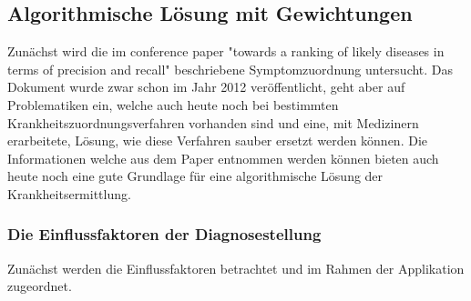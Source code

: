 \subsection{Algorithmische Lösung mit Gewichtungen}
Zunächst wird die im conference paper "towards a ranking of likely diseases in terms of precision and recall" beschriebene Symptomzuordnung untersucht. Das Dokument wurde zwar schon im Jahr 2012 veröffentlicht, geht aber auf Problematiken ein, welche auch heute noch bei bestimmten Krankheitszuordnungsverfahren vorhanden sind und eine, mit Medizinern erarbeitete, Lösung, wie diese Verfahren sauber ersetzt werden können. Die Informationen welche aus dem Paper entnommen werden können bieten auch heute noch eine gute Grundlage für eine algorithmische Lösung der Krankheitsermittlung.

\subsubsection{Die Einflussfaktoren der Diagnosestellung}
Zunächst werden die Einflussfaktoren betrachtet und im Rahmen der Applikation zugeordnet.
